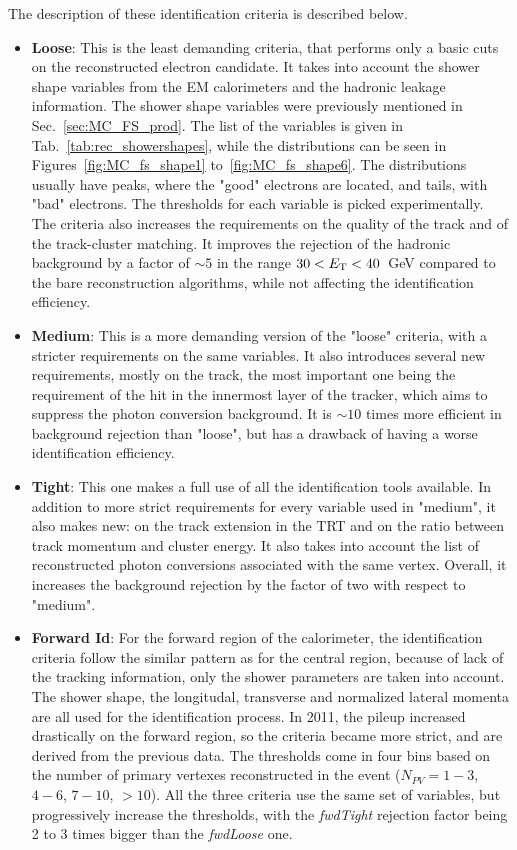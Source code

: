 The description of these identification criteria is described below.
\begin{itemize}
\item {\bfseries Loose}: This is the least demanding criteria, that performs only a basic cuts on the reconstructed electron candidate. It takes into account the shower shape variables from the EM calorimeters and the hadronic leakage information. The shower shape variables were previously mentioned in Sec.~\ref{sec:MC_FS_prod}. The list of the variables is given in Tab.~\ref{tab:rec_showershapes}, while the distributions can be seen in Figures~\ref{fig:MC_fs_shape1} to~\ref{fig:MC_fs_shape6}. The distributions usually have peaks, where the "good" electrons are located, and tails, with "bad" electrons. The thresholds for each variable is picked experimentally. The criteria also increases the requirements on the quality of the track and of the track-cluster matching. It improves the rejection of the hadronic background by a factor of $\sim 5$ in the range $30 < E_{\mathrm{T}} < 40$~GeV compared to the bare reconstruction algorithms, while not affecting the identification efficiency.
\item {\bfseries Medium}: This is a more demanding version of the "loose" criteria, with a stricter requirements on the same variables. It also introduces several new requirements, mostly on the track, the most important one being the requirement of the hit in the innermost layer of the tracker, which aims to suppress the photon conversion background. It is $\sim 10$ times more efficient in background rejection than "loose", but has a drawback of having a worse identification efficiency.
\item {\bfseries Tight}: This one makes a full use of all the identification tools available. In addition to more strict requirements for every variable used in "medium", it also makes new: on the track extension in the TRT and on the ratio between track momentum and cluster energy. It also takes into account the list of reconstructed photon conversions associated with the same vertex. Overall, it increases the background rejection by the factor of two with respect to "medium".
\item {\bfseries Forward Id}: For the forward region of the calorimeter, the identification criteria follow the similar pattern as for the central region, because of lack of the tracking information, only the shower parameters are taken into account. The shower shape, the longitudal, transverse and normalized lateral momenta are all used for the identification process. In 2011, the pileup increased drastically on the forward region, so the criteria became more strict, and are derived from the previous data. The thresholds come in four bins based on the number of primary vertexes reconstructed in the event ($N_{PV} = 1-3$, $4-6$, $7-10$, $>10$). All the three criteria use the same set of variables, but progressively increase the thresholds, with the {\itshape fwdTight} rejection factor being 2 to 3 times bigger than the {\itshape fwdLoose} one.
\end{itemize}

